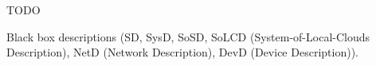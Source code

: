%
%

TODO

Black box descriptions (SD, SysD, SoSD, SoLCD (System-of-Local-Clouds Description), NetD (Network Description), DevD (Device Description)).